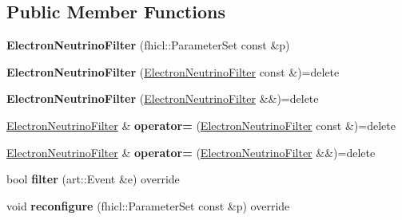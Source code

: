 \subsection*{Public Member Functions}
\begin{DoxyCompactItemize}
\item 
\hypertarget{classlee_1_1ElectronNeutrinoFilter_ad537c8e179a70178666c31f25a1d12d9}{{\bfseries Electron\-Neutrino\-Filter} (fhicl\-::\-Parameter\-Set const \&p)}\label{classlee_1_1ElectronNeutrinoFilter_ad537c8e179a70178666c31f25a1d12d9}

\item 
\hypertarget{classlee_1_1ElectronNeutrinoFilter_a25d84e7ecab146aa6b0e0363b505c961}{{\bfseries Electron\-Neutrino\-Filter} (\hyperlink{classlee_1_1ElectronNeutrinoFilter}{Electron\-Neutrino\-Filter} const \&)=delete}\label{classlee_1_1ElectronNeutrinoFilter_a25d84e7ecab146aa6b0e0363b505c961}

\item 
\hypertarget{classlee_1_1ElectronNeutrinoFilter_a97154ec66a795362acd5f35accf6f7d6}{{\bfseries Electron\-Neutrino\-Filter} (\hyperlink{classlee_1_1ElectronNeutrinoFilter}{Electron\-Neutrino\-Filter} \&\&)=delete}\label{classlee_1_1ElectronNeutrinoFilter_a97154ec66a795362acd5f35accf6f7d6}

\item 
\hypertarget{classlee_1_1ElectronNeutrinoFilter_a3d0689e2f0d746914a8cc9540328df91}{\hyperlink{classlee_1_1ElectronNeutrinoFilter}{Electron\-Neutrino\-Filter} \& {\bfseries operator=} (\hyperlink{classlee_1_1ElectronNeutrinoFilter}{Electron\-Neutrino\-Filter} const \&)=delete}\label{classlee_1_1ElectronNeutrinoFilter_a3d0689e2f0d746914a8cc9540328df91}

\item 
\hypertarget{classlee_1_1ElectronNeutrinoFilter_a14482d0f5624d8671cb0109c3b3f3d5c}{\hyperlink{classlee_1_1ElectronNeutrinoFilter}{Electron\-Neutrino\-Filter} \& {\bfseries operator=} (\hyperlink{classlee_1_1ElectronNeutrinoFilter}{Electron\-Neutrino\-Filter} \&\&)=delete}\label{classlee_1_1ElectronNeutrinoFilter_a14482d0f5624d8671cb0109c3b3f3d5c}

\item 
\hypertarget{classlee_1_1ElectronNeutrinoFilter_a81d6833e781342640df84654c8f7f203}{bool {\bfseries filter} (art\-::\-Event \&e) override}\label{classlee_1_1ElectronNeutrinoFilter_a81d6833e781342640df84654c8f7f203}

\item 
\hypertarget{classlee_1_1ElectronNeutrinoFilter_a891b82ec2e7b2ef034e701cf51a68ac5}{void {\bfseries reconfigure} (fhicl\-::\-Parameter\-Set const \&p) override}\label{classlee_1_1ElectronNeutrinoFilter_a891b82ec2e7b2ef034e701cf51a68ac5}

\end{DoxyCompactItemize}
